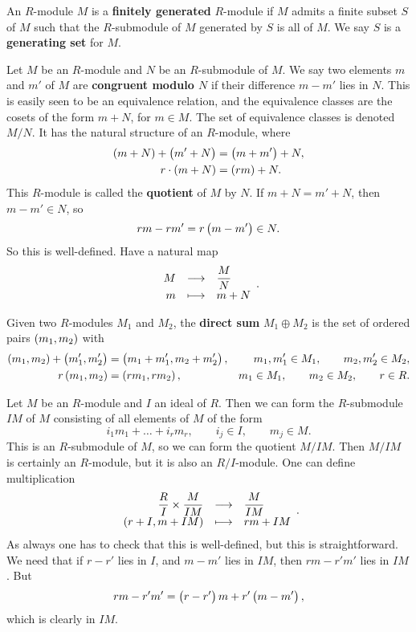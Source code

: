 \begin{definition}
An $ R $-module $ M $ is a \textbf{finitely generated} $ R $-module if $ M $ admits a finite subset $ S $ of $ M $ such that the $ R $-submodule of $ M $ generated by $ S $ is all of $ M $. We say $ S $ is a \textbf{generating set} for $ M $.
\end{definition}

\begin{definition}
Let $ M $ be an $ R $-module and $ N $ be an $ R $-submodule of $ M $. We say two elements $ m $ and $ m' $ of $ M $ are \textbf{congruent modulo $ N $} if their difference $ m - m' $ lies in $ N $. This is easily seen to be an equivalence relation, and the equivalence classes are the cosets of the form $ m + N $, for $ m \in M $. The set of equivalence classes is denoted $ M / N $. It has the natural structure of an $ R $-module, where
\begin{align*}
\br{m + N} + \br{m' + N} & = \br{m + m'} + N, \\
r \cdot \br{m + N} & = \br{rm} + N.
\end{align*}
This $ R $-module is called the \textbf{quotient} of $ M $ by $ N $. If $ m + N = m' + N $, then $ m - m' \in N $, so
$$ rm - rm' = r\br{m - m'} \in N. $$
So this is well-defined. Have a natural map
$$ \function{M}{\dfrac{M}{N}}{m}{m + N}. $$
\end{definition}

\pagebreak

\begin{definition}
Given two $ R $-modules $ M_1 $ and $ M_2 $, the \textbf{direct sum} $ M_1 \oplus M_2 $ is the set of ordered pairs $ \br{m_1, m_2} $ with
\begin{align*}
\br{m_1, m_2} + \br{m_1', m_2'} & = \br{m_1 + m_1', m_2 + m_2'}, & m_1, m_1' \in M_1, \qquad m_2, m_2' \in M_2, \\
r\br{m_1, m_2} & = \br{rm_1, rm_2}, & m_1 \in M_1, \qquad m_2 \in M_2, \qquad r \in R.
\end{align*}
\end{definition}

\begin{example*}
Let $ M $ be an $ R $-module and $ I $ an ideal of $ R $. Then we can form the $ R $-submodule $ IM $ of $ M $ consisting of all elements of $ M $ of the form
$$ i_1m_1 + \dots + i_rm_r, \qquad i_j \in I, \qquad m_j \in M. $$
This is an $ R $-submodule of $ M $, so we can form the quotient $ M / IM $. Then $ M / IM $ is certainly an $ R $-module, but it is also an $ R / I $-module. One can define multiplication
$$ \function{\dfrac{R}{I} \times \dfrac{M}{IM}}{\dfrac{M}{IM}}{\br{r + I, m + IM}}{rm + IM}. $$
As always one has to check that this is well-defined, but this is straightforward. We need that if $ r - r' $ lies in $ I $, and $ m - m' $ lies in $ IM $, then $ rm - r'm' $ lies in $ IM $. But
$$ rm - r'm' = \br{r - r'}m + r'\br{m - m'}, $$
which is clearly in $ IM $.
\end{example*}

